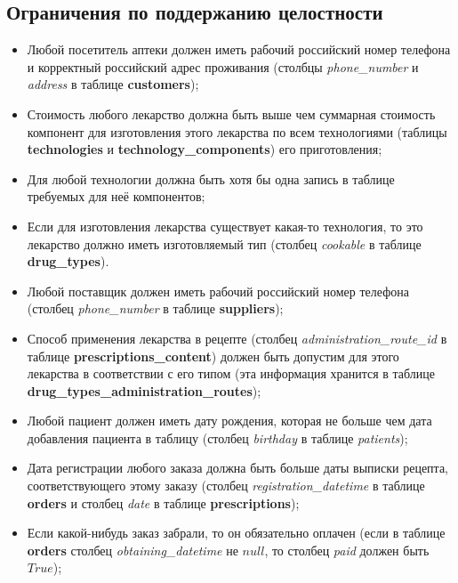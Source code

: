 \documentclass[a4paper]{article}
\newcommand{\dbtable}[1]{\textbf{#1}}
\newcommand{\dbtableref}[1]{\textit{#1}}
\begin{document}
		\subsection{Ограничения по поддержанию целостности}
			\begin{itemize}
				\item Любой посетитель аптеки должен иметь рабочий российский номер телефона и корректный российский адрес проживания (столбцы \dbtableref{phone\_number} и \dbtableref{address} в таблице \dbtable{customers}); 
				
				\item Стоимость любого лекарство должна быть выше чем суммарная стоимость компонент для изготовления этого лекарства по всем технологиями (таблицы \dbtable{technologies} и \dbtable{technology\_components}) его приготовления;
				
				\item Для любой технологии должна быть хотя бы одна запись в таблице требуемых для неё компонентов;
				
				\item Если для изготовления лекарства существует какая-то технология, то это лекарство должно иметь изготовляемый тип (столбец \dbtableref{cookable} в таблице \dbtable{drug\_types}).
				
				\item Любой поставщик должен иметь рабочий российский номер телефона \newline (столбец \dbtableref{phone\_number} в таблице \dbtable{suppliers});
				
				\item Способ применения лекарства в рецепте (столбец \dbtableref{administration\_route\_id} в таблице \dbtable{prescriptions\_content}) должен быть допустим для этого лекарства в соответствии с его типом (эта информация хранится в таблице \dbtable{drug\_types\_administration\_routes});
				
				\item Любой пациент должен иметь дату рождения, которая не больше чем дата добавления пациента в таблицу (столбец \dbtableref{birthday} в таблице \dbtableref{patients});
				
				\item Дата регистрации любого заказа должна быть больше даты выписки рецепта, соответствующего этому заказу (столбец \dbtableref{registration\_datetime} в таблице \dbtable{orders} и столбец \dbtableref{date} в таблице \dbtable{prescriptions});
				
				\item Если какой-нибудь заказ забрали, то он обязательно оплачен (если в таблице \dbtable{orders} столбец \dbtableref{obtaining\_datetime} не $null$, то столбец \dbtableref{paid} должен быть $True$);
				

\end{itemize}
\end{document}
